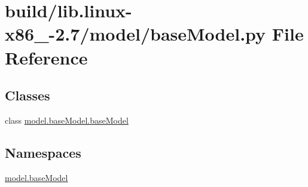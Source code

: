 \hypertarget{build_2lib_8linux-x86__64-2_87_2model_2baseModel_8py}{}\section{build/lib.linux-\/x86\+\_-\/2.7/model/base\+Model.py File Reference}
\label{build_2lib_8linux-x86__64-2_87_2model_2baseModel_8py}
\subsection*{Classes}
\begin{DoxyCompactItemize}
\item 
class \hyperlink{classmodel_1_1baseModel_1_1baseModel}{model.\+base\+Model.\+base\+Model}
\end{DoxyCompactItemize}
\subsection*{Namespaces}
\begin{DoxyCompactItemize}
\item 
 \hyperlink{namespacemodel_1_1baseModel}{model.\+base\+Model}
\end{DoxyCompactItemize}
